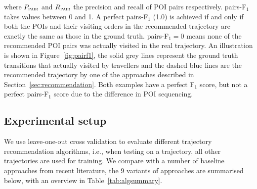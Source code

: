 where $P_{\textsc{pair}}$ and $R_{\textsc{pair}}$ the precision and recall of POI pairs respectively.
%
%
%
%
pairs-F$_1$ takes values between 0 and 1. A perfect pairs-F$_1$ (1.0) is achieved if and only if
both the POIs and their visiting orders in the
recommended trajectory are exactly the same as those in the ground truth.
pairs-F$_1 = 0$ means none of the recommended POI pairs was actually visited in the real trajectory.
An illustration is shown in Figure~\ref{fig:pairf1},
the solid grey lines represent the ground truth transitions that actually visited by travellers
and the dashed blue lines are the recommended trajectory by one of the approaches described in Section~\ref{sec:recommendation}.
Both examples have a perfect F$_1$ score, but not a perfect pairs-F$_1$ score due to the difference in POI sequencing.


\subsection{Experimental setup}
\label{sec:setup}
\secmoveup
%
%

%

%

We use leave-one-out cross validation to evaluate different trajectory recommendation algorithms,
i.e., when testing on a trajectory, all other trajectories are used for training.
We compare with a number of baseline approaches from recent literature, the 9 variants of approaches
are summarised below, with an overview in Table~\ref{tab:algsummary}.

